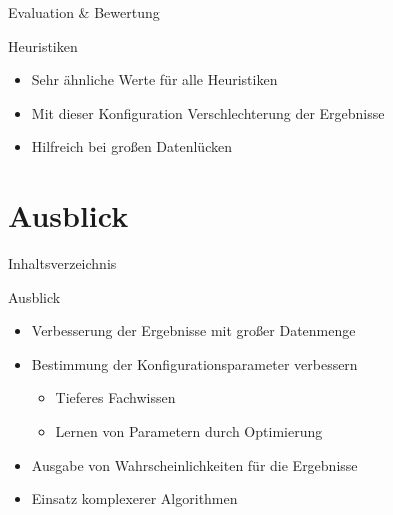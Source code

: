 \begin{frame}{Evaluation \& Bewertung}
\begin{block}{Heuristiken}
\begin{itemize}
	\item Sehr ähnliche Werte für alle Heuristiken
	\item Mit dieser Konfiguration Verschlechterung der Ergebnisse
	\item Hilfreich bei großen Datenlücken
\end{itemize}
\end{block}
\end{frame}

\section{Ausblick}
\begin{frame}{Inhaltsverzeichnis}
\tableofcontents[currentsection]
\end{frame}

\begin{frame}{Ausblick}
\begin{itemize}
	\item Verbesserung der Ergebnisse mit großer Datenmenge
	\item Bestimmung der Konfigurationsparameter verbessern
	\begin{itemize}
		\item Tieferes Fachwissen
		\item Lernen von Parametern durch Optimierung
	\end{itemize}
	\item Ausgabe von Wahrscheinlichkeiten für die Ergebnisse
	\item Einsatz komplexerer Algorithmen
\end{itemize}
\end{frame}
